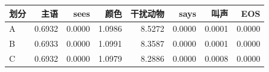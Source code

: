 \begin{center}\begin{tabular}{lrrrrrrr}\toprule
划分 & 主语 & sees & 颜色 & 干扰动物 & says & 叫声 & EOS\\\midrule
A & 0.6932 & 0.0000 & 1.0986 & 8.5272 & 0.0000 & 0.0001 & 0.0000 \\
B & 0.6933 & 0.0000 & 1.0991 & 8.3587 & 0.0000 & 0.0001 & 0.0000 \\
C & 0.6932 & 0.0000 & 1.0979 & 8.2886 & 0.0000 & 0.0008 & 0.0000 \\
\bottomrule\end{tabular}\end{center}
